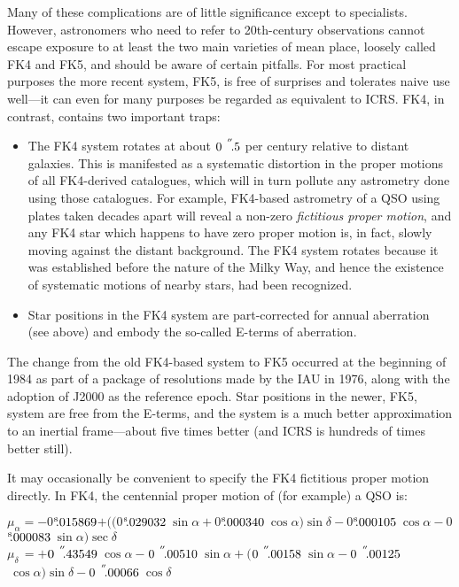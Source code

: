 \documentclass[11pt,fleqn,twoside]{article}
\renewcommand{\_}{{\tt\char'137}}     %
\newcommand{\arcseci}[1] {$#1\hspace{0.05em}$\raisebox{-0.5ex}
                         {$^{'\hspace{-0.1em}'\hspace{0.0em}}$}}
\newcommand{\arcsec}[2] {\arcseci{#1}$\hspace{-0.35em}.#2$}
\newcommand{\tseci}[1]   {$#1$\mbox{$^{\rm s}$}}
\newcommand{\tsec}[2]    {\tseci{#1}$\hspace{-0.3em}.#2$}
\begin{document}
Many of these complications are of little significance except to
specialists.  However, astronomers who need to refer to
20th-century observations cannot
escape exposure to at least the two main varieties of
mean place, loosely called
FK4 and FK5, and should be aware of
certain pitfalls.  For most practical purposes the more recent
system, FK5, is free of surprises and tolerates naive
use well---it can even for many purposes be regarded
as equivalent to ICRS.  FK4, in contrast, contains two important traps:
\begin{itemize}
\item The FK4 system rotates at about
      \arcsec{0}{5} per century relative to distant galaxies.
      This is manifested as a systematic distortion in the
      proper motions of all FK4-derived catalogues, which will
      in turn pollute any astrometry done using those catalogues.
      For example, FK4-based astrometry of a QSO using plates
      taken decades apart will reveal a non-zero {\it fictitious proper
      motion}, and any FK4 star which happens to have zero proper
      motion is, in fact, slowly moving against the distant
      background.  The FK4 system rotates because it was
      established before the nature of the Milky Way, and hence the
      existence of systematic motions of nearby stars, had been
      recognized.
\item Star positions in the FK4 system are part-corrected for
      annual aberration (see above) and embody the so-called
      E-terms of aberration.
\end{itemize}
The change from the old FK4-based system to FK5
occurred at the beginning
of 1984 as part of a package of resolutions made by the IAU in 1976,
along with the adoption of J2000 as the reference epoch.  Star
positions in the newer, FK5, system are free from the E-terms, and
the system is a much better approximation to an
inertial frame---about five times better (and ICRS is hundreds of times
better still).

It may occasionally be convenient to specify the FK4 fictitious proper
motion directly.  In FK4, the centennial proper motion of (for example)
a QSO is:
 
$\mu_\alpha=-$\tsec{0}{015869}$
          +(($\tsec{0}{029032}$~\sin \alpha
            +$\tsec{0}{000340}$~\cos \alpha ) \sin \delta
            -$\tsec{0}{000105}$~\cos \alpha
            -$\tsec{0}{000083}$~\sin \alpha ) \sec \delta $ \\
$\mu_\delta\,=+$\arcsec{0}{43549}$~\cos \alpha
              -$\arcsec{0}{00510}$~\sin \alpha +
              ($\arcsec{0}{00158}$~\sin \alpha
              -$\arcsec{0}{00125}$~\cos \alpha ) \sin \delta
              -$\arcsec{0}{00066}$~\cos \delta $
\end{document}
